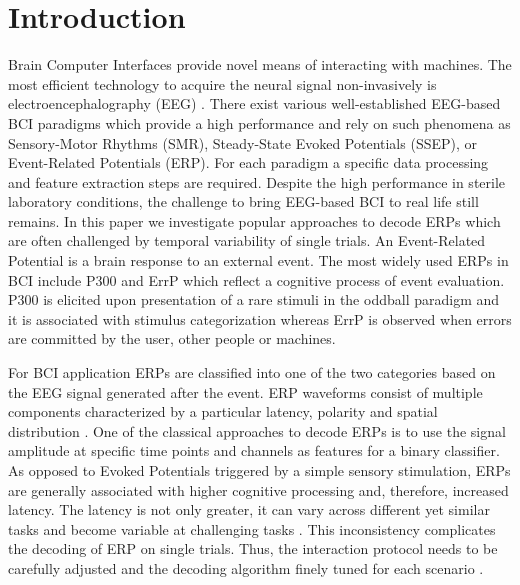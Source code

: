 \documentclass[12pt]{iopart}
\begin{document}
\section{Introduction}
\label{sec:intro}

Brain Computer Interfaces provide novel means of interacting
with machines. The most efficient technology to acquire
the neural signal non-invasively is electroencephalography (EEG) \cite{luck_introduction_2005}.
There exist various well-established EEG-based BCI paradigms which
provide a high performance and rely on such phenomena as
Sensory-Motor Rhythms (SMR), Steady-State Evoked Potentials (SSEP),
or Event-Related Potentials (ERP).
For each paradigm a specific data processing and feature
extraction steps are required.
Despite the high performance in sterile laboratory
conditions, the challenge to bring EEG-based BCI to real life
still remains. In this paper we investigate popular approaches to decode ERPs
which are often challenged by temporal variability of single trials.
An Event-Related Potential is a brain response to an external event.
The most widely used ERPs in BCI include P300 and ErrP which
reflect a cognitive process of event evaluation.
P300 is elicited upon presentation of a rare stimuli in the oddball paradigm
and it is associated with stimulus categorization whereas
ErrP is observed when errors are committed by the user, other people or machines.

For BCI application ERPs are classified into one of the two categories 
based on the EEG signal generated after the event.
ERP waveforms consist of multiple components characterized
by a particular latency, polarity and spatial distribution \cite{duncan_event-related_2009}.
One of the classical approaches to decode ERPs is to 
use the signal amplitude at specific time points and channels as features
for a binary classifier.
As opposed to Evoked Potentials triggered by a simple sensory stimulation,
ERPs are generally associated with higher cognitive processing
and, therefore, increased latency. The latency is not only greater, it can
vary across different yet similar tasks and become variable
at challenging tasks \cite{arico_evaluation_2013}. 
This inconsistency complicates the decoding of ERP on single trials.
Thus, the interaction
protocol needs to be carefully adjusted and the decoding
algorithm finely tuned for each scenario \cite{iturrate_task-dependent_2013}.
\end{document}

